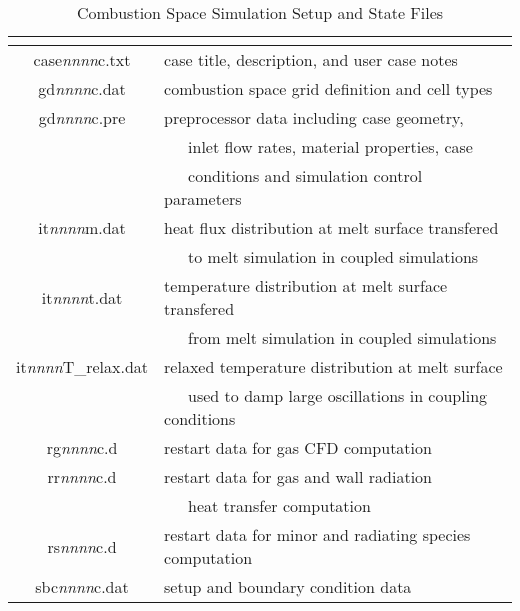 \documentclass[twoside,12pt]{article}
\newcommand{\var}[1]{\text{\it #1}}
\numberwithin{equation}{section}
\begin{document}
\begin{table}[!hbp]
\caption{Combustion Space Simulation Setup and State Files}
\label{sim-files-comb}
\centering
\begin{tabular}{|c|l|}
\hline
\var{File Name} & \multicolumn{1}{|c|}{ \var{Explanation}} \\
\hline
case\textit{nnnn}c.txt & case title, description, and user case notes \\
gd\textit{nnnn}c.dat  & combustion space grid definition and cell types \\
gd\textit{nnnn}c.pre  & preprocessor data including case geometry, \\
                      & ~~~inlet flow rates, material properties, case \\
                      & ~~~conditions and simulation control parameters \\
it\textit{nnnn}m.dat  & heat flux distribution at melt surface transfered \\
                      & ~~~to melt simulation in coupled simulations \\
it\textit{nnnn}t.dat  & temperature distribution at melt surface transfered \\
                      & ~~~from melt simulation in coupled simulations \\
it\textit{nnnn}T\_relax.dat  & relaxed temperature distribution at melt surface \\
                      & ~~~used to damp large oscillations in coupling conditions \\
rg\textit{nnnn}c.d  & restart data for gas CFD computation \\
rr\textit{nnnn}c.d  & restart data for gas and wall radiation \\
                    & ~~~heat transfer computation \\
rs\textit{nnnn}c.d  & restart data for minor and radiating species computation \\
sbc\textit{nnnn}c.dat  & setup and boundary condition data \\
\hline
\end{tabular}
\end{table}
\end{document}
